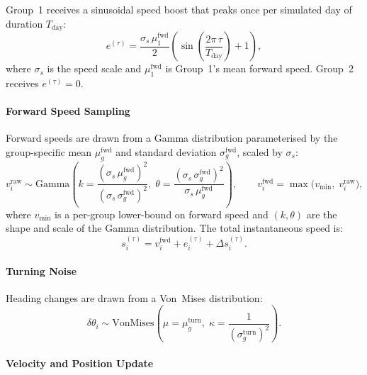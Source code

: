 \documentclass{article}
\begin{document}
{Group~1 receives a sinusoidal speed boost that peaks once per simulated day
of duration $T_{\mathrm{day}}$:
%
\begin{equation}
  e^{(\tau)} = \frac{\sigma_s \, \mu_1^{\mathrm{fwd}}}{2}
               \left(\sin\!\left(\frac{2\pi\,\tau}{T_{\mathrm{day}}}\right) + 1\right),
\end{equation}
%
where $\sigma_s$ is the speed scale and
$\mu_1^{\mathrm{fwd}}$ is Group~1's mean forward speed.  Group~2 receives
$e^{(\tau)} = 0$.

\paragraph{Forward Speed Sampling}

Forward speeds are drawn from a Gamma distribution parameterised by the
group-specific mean $\mu_g^{\mathrm{fwd}}$ and standard deviation
$\sigma_g^{\mathrm{fwd}}$, scaled by $\sigma_s$:
%
\begin{equation}\label{eq:gamma_si}
  v_i^{\mathrm{raw}} \sim \mathrm{Gamma}\!\left(
    k = \frac{(\sigma_s\,\mu_g^{\mathrm{fwd}})^2}{(\sigma_s\,\sigma_g^{\mathrm{fwd}})^2},\;
    \theta = \frac{(\sigma_s\,\sigma_g^{\mathrm{fwd}})^2}{\sigma_s\,\mu_g^{\mathrm{fwd}}}
  \right),
  \qquad
  v_i^{\mathrm{fwd}} = \max\!\bigl(v_{\min},\; v_i^{\mathrm{raw}}\bigr),
\end{equation}
%
where $v_{\min}$ is a per-group lower-bound on forward speed and
$(k, \theta)$ are the shape and scale of the Gamma distribution.  The total
instantaneous speed is:
%
\begin{equation}
  s_i^{(\tau)} = v_i^{\mathrm{fwd}} + e_i^{(\tau)} + \Delta s_i^{(\tau)}.
\end{equation}

\paragraph{Turning Noise}

Heading changes are drawn from a Von~Mises distribution:
%
\begin{equation}\label{eq:vonmises_si}
  \delta\theta_i \sim \mathrm{VonMises}\!\left(
    \mu = \mu_g^{\mathrm{turn}},\;
    \kappa = \frac{1}{(\sigma_g^{\mathrm{turn}})^2}
  \right).
\end{equation}

\paragraph{Velocity and Position Update}

}
\end{document}
